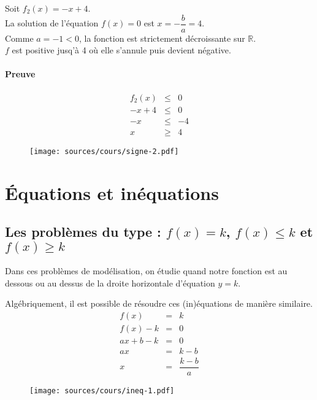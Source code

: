\documentclass[paper=a4, fontsize=9pt]{scrartcl} %
\begin{document}
\begin{multicols}{2}
  \begin{Proposition}
    Soit $f_2(x) = -x + 4$.\\
    La solution de l'équation $f(x) = 0$ est $x = -\dfrac{b}{a} = 4$.\\
    Comme $a = -1 < 0$, la fonction est strictement décroissante sur $\mathbb{R}$.\\ 
    $f$ est positive jusq'à 4 où elle s'annule puis devient négative.
  \end{Proposition}
  \paragraph{Preuve}

  \begin{eqnarray*}
    f_2(x) & \leq & 0\\
    -x + 4 & \leq & 0 \\
    -x & \leq & -4 \\
    x & \geq & 4
  \end{eqnarray*}

  \begin{figure}[H]
    \centering
    \texttt{[image: sources/cours/signe-2.pdf]}
  \end{figure}

\end{multicols}

\newpage 

\section{Équations et inéquations}

\subsection{Les problèmes du type : $f(x) = k$, $f(x) \leq k$ et $f(x) \geq k$}

\begin{multicols}{2}

  Dans ces problèmes de modélisation, on étudie quand notre fonction est au dessous ou au dessus de la droite horizontale d'équation $y = k$.

  Algébriquement, il est possible de résoudre ces (in)équations de manière similaire.\\
  \begin{eqnarray*}
    f(x) & = & k\\
    f(x) - k & = & 0\\
    ax + b - k & = & 0\\
    ax &=& k-b\\
    x &=& \dfrac{k-b}{a}
  \end{eqnarray*}

  \begin{figure}[H]
    \centering
    \texttt{[image: sources/cours/ineq-1.pdf]}
  \end{figure}

\end{multicols}
\end{document}
